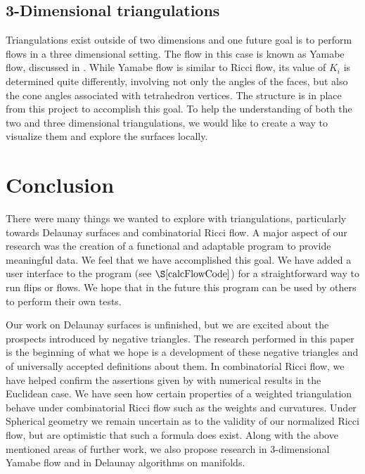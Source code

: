 \documentclass[12pt]{article}
\begin{document}
\subsection{3-Dimensional triangulations}
Triangulations exist outside of two dimensions and one future goal is to perform flows in a three dimensional setting. The flow in this case is known as Yamabe flow, discussed in \cite{DrG}. While Yamabe flow is similar to Ricci flow, its value of $K_i$ is determined quite differently, involving not only the angles of the faces, but also the cone angles associated with tetrahedron vertices. The structure is in place from this project to accomplish this goal. To help the understanding of both the two and three dimensional triangulations, we would like to create a way to visualize them and explore the surfaces locally.\newline

\section{Conclusion}

There were many things we wanted to explore with triangulations, particularly towards Delaunay surfaces and combinatorial Ricci flow. A major aspect of our research was the creation of a functional and adaptable program to provide meaningful data. We feel that we have accomplished this goal. We have added a user interface to the program (see $\S\ref{calcFlowCode}$) for a straightforward way to run flips or flows. We hope that in the future this program can be used by others to perform their own tests.\newline

\noindent Our work on Delaunay surfaces is unfinished, but we are excited about the prospects introduced by negative triangles. The research performed in this paper is the beginning of what we hope is a development of these negative triangles and of universally accepted definitions about them. In combinatorial Ricci flow, we have helped confirm the assertions given by \cite{chowluo} with numerical results in the Euclidean case. We have seen how certain properties of a weighted triangulation behave under combinatorial Ricci flow such as the weights and curvatures. Under Spherical geometry we remain uncertain as to the validity of our normalized Ricci flow, but are optimistic that such a formula does exist. Along with the above mentioned areas of further work, we also propose research in 3-dimensional Yamabe flow and in Delaunay algorithms on manifolds.\newline
\end{document}
